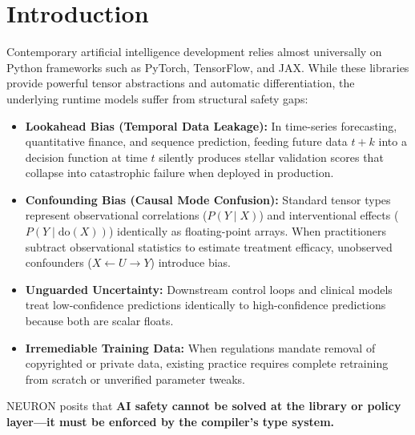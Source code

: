 \documentclass[11pt,twocolumn]{article}
\begin{document}
\section{Introduction}
Contemporary artificial intelligence development relies almost universally on Python frameworks such as PyTorch, TensorFlow, and JAX. While these libraries provide powerful tensor abstractions and automatic differentiation, the underlying runtime models suffer from structural safety gaps:
\begin{itemize}
  \item \textbf{Lookahead Bias (Temporal Data Leakage):} In time-series forecasting, quantitative finance, and sequence prediction, feeding future data $t+k$ into a decision function at time $t$ silently produces stellar validation scores that collapse into catastrophic failure when deployed in production.
  \item \textbf{Confounding Bias (Causal Mode Confusion):} Standard tensor types represent observational correlations ($P(Y \mid X)$) and interventional effects ($P(Y \mid \text{do}(X))$) identically as floating-point arrays. When practitioners subtract observational statistics to estimate treatment efficacy, unobserved confounders ($X \leftarrow U \to Y$) introduce bias.
  \item \textbf{Unguarded Uncertainty:} Downstream control loops and clinical models treat low-confidence predictions identically to high-confidence predictions because both are scalar floats.
  \item \textbf{Irremediable Training Data:} When regulations mandate removal of copyrighted or private data, existing practice requires complete retraining from scratch or unverified parameter tweaks.
\end{itemize}

NEURON posits that \textbf{AI safety cannot be solved at the library or policy layer—it must be enforced by the compiler's type system.}
\end{document}
